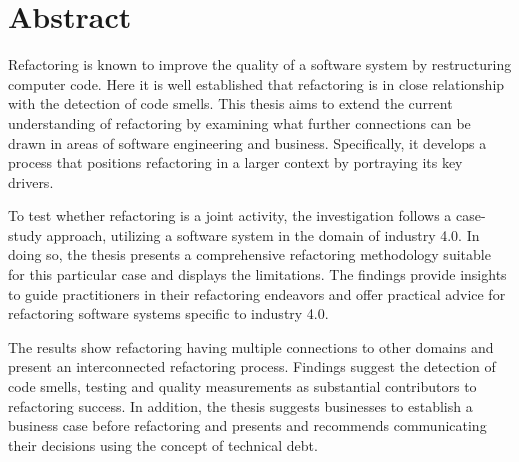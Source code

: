\chapter*{Abstract}
\label{cha:abstract}

Refactoring is known to improve the quality of a software system by restructuring computer code. Here it is well established that refactoring is in close relationship with the detection of code smells.
This thesis aims to extend the current understanding of refactoring by examining what further connections can be drawn in areas of software engineering and business. Specifically, it develops a process that positions refactoring in a larger context by portraying its key drivers.

To test whether refactoring is a joint activity, the investigation follows a case-study approach, utilizing a software system in the domain of industry 4.0. In doing so, the thesis presents a comprehensive refactoring methodology suitable for this particular case and displays the limitations. The findings provide insights to guide practitioners in their refactoring endeavors and offer practical advice for refactoring software systems specific to industry 4.0.

The results show refactoring having multiple connections to other domains and present an interconnected refactoring process. Findings suggest the detection of code smells, testing and quality measurements as substantial contributors to refactoring success. In addition, the thesis suggests businesses to establish a business case before refactoring and presents and recommends communicating their decisions using the concept of technical debt.
